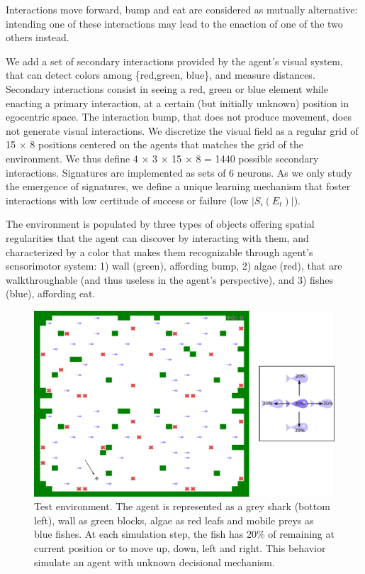 \documentclass[conference]{IEEEtran}
\begin{document}
Interactions move forward, bump and eat are considered as mutually alternative: intending one of these interactions may lead to the enaction of one of the two others instead. %

We add a set of secondary interactions provided by the agent’s visual system, that can detect colors among \{red,green, blue\}, and measure distances.  Secondary interactions consist in seeing a red, green or blue element while enacting a primary interaction, at a certain (but initially unknown) position in egocentric space. The interaction bump, that does not produce movement, does not generate visual interactions. We discretize the visual field as a regular grid of 15 × 8 positions centered on the agents that matches the grid of the environment. We thus define 4 × 3 × 15 × 8 = 1440 possible secondary interactions.
Signatures are implemented as sets of 6 neurons. %
As we only study the emergence of signatures, we define a unique learning mechanism that foster interactions with low certitude of success or failure (low $|S_i(E_t)|$). %

The environment is populated by three types of objects offering spatial regularities that the agent can discover by interacting with them, and characterized by a color that makes them recognizable through agent's sensorimotor system: 1) wall (green), affording bump, 2) algae (red), that are walkthroughable (and thus useless in the agent's perspective), and 3) fishes (blue), affording eat.

\begin{figure}[htbp]
\centerline{\includegraphics[scale=0.28]{img/environment.pdf}}
\caption{Test environment. The agent is represented as a grey shark (bottom left), wall as green blocks, algae as red leafs and mobile preys as blue fishes. At each simulation step, the fish has 20\% of remaining at current position or to move up, down, left and right. This behavior simulate an agent with unknown decisional mechanism.}
\label{fig}
\end{figure}
\end{document}
